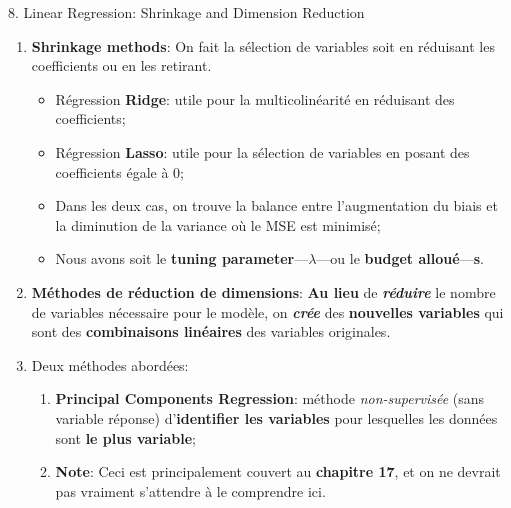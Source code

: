 \documentclass[12pt, titlepage, french]{report}
\begin{document}
\begin{CHPT_SUMM}[label = {VALID-SHRINKAGE}]{8. Linear Regression:  Shrinkage and Dimension Reduction}
\begin{enumerate}
	\item	\textbf{Shrinkage methods}: On fait la sélection de variables soit en réduisant les coefficients ou en les retirant.
	\begin{itemize}
		\item	Régression \textbf{Ridge}: utile pour la multicolinéarité en réduisant des coefficients;
		\item	Régression \textbf{Lasso}: utile pour la sélection de variables en posant des coefficients égale à 0;
		\item	Dans les deux cas, on trouve la balance entre l'augmentation du biais et la diminution de la variance où le MSE est minimisé;
		\item	Nous avons soit le \textbf{tuning parameter}---$\lambda$---ou le \textbf{budget alloué}---\textbf{s}.
	\end{itemize}
	\item	\textbf{Méthodes de réduction de dimensions}: \textbf{Au lieu} de \textit{\textbf{réduire}} le nombre de variables nécessaire pour le modèle, on \textbf{\textit{crée}} des \textbf{nouvelles variables} qui sont des \textbf{combinaisons linéaires} des variables originales.
	\item[]	Deux méthodes abordées: 
	\begin{enumerate}
		\item	\textbf{Principal Components Regression}: méthode \textit{non-supervisée} (sans variable réponse) d'\textbf{identifier les variables} pour lesquelles les données sont \textbf{le plus variable};
		\item[]	\textbf{Note}: Ceci est principalement couvert au \textbf{chapitre 17}, et on ne devrait pas vraiment s'attendre à le comprendre ici.
		\begin{itemize}

\end{itemize}
\end{enumerate}
\end{enumerate}
\end{CHPT_SUMM}
\end{document}
